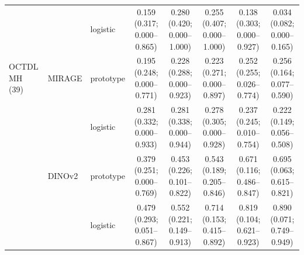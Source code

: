 \begin{tabular}{@{}lll*{5}{c}@{}}
 &  & logistic & \makecell{0.159\\{\scriptsize (0.317; 0.000--0.865)}} & \makecell{0.280\\{\scriptsize (0.420; 0.000--1.000)}} & \makecell{0.255\\{\scriptsize (0.407; 0.000--1.000)}} & \makecell{0.138\\{\scriptsize (0.303; 0.000--0.927)}} & \makecell{0.034\\{\scriptsize (0.082; 0.000--0.165)}} \\
\addlinespace[2pt]
OCTDL MH (39) & MIRAGE & prototype & \makecell{0.195\\{\scriptsize (0.248; 0.000--0.771)}} & \makecell{0.228\\{\scriptsize (0.288; 0.000--0.923)}} & \makecell{0.223\\{\scriptsize (0.271; 0.000--0.897)}} & \makecell{0.252\\{\scriptsize (0.255; 0.026--0.774)}} & \makecell{0.256\\{\scriptsize (0.164; 0.077--0.590)}} \\
 &  & logistic & \makecell{0.281\\{\scriptsize (0.332; 0.000--0.933)}} & \makecell{0.281\\{\scriptsize (0.338; 0.000--0.944)}} & \makecell{0.278\\{\scriptsize (0.305; 0.000--0.928)}} & \makecell{0.237\\{\scriptsize (0.245; 0.010--0.754)}} & \makecell{0.222\\{\scriptsize (0.149; 0.056--0.508)}} \\
 & DINOv2 & prototype & \makecell{0.379\\{\scriptsize (0.251; 0.000--0.769)}} & \makecell{0.453\\{\scriptsize (0.226; 0.101--0.822)}} & \makecell{0.543\\{\scriptsize (0.189; 0.205--0.846)}} & \makecell{0.671\\{\scriptsize (0.116; 0.486--0.847)}} & \makecell{0.695\\{\scriptsize (0.063; 0.615--0.821)}} \\
 &  & logistic & \makecell{0.479\\{\scriptsize (0.293; 0.051--0.867)}} & \makecell{0.552\\{\scriptsize (0.221; 0.149--0.913)}} & \makecell{0.714\\{\scriptsize (0.153; 0.415--0.892)}} & \makecell{0.819\\{\scriptsize (0.104; 0.621--0.923)}} & \makecell{0.890\\{\scriptsize (0.071; 0.749--0.949)}} \\

\end{tabular}
